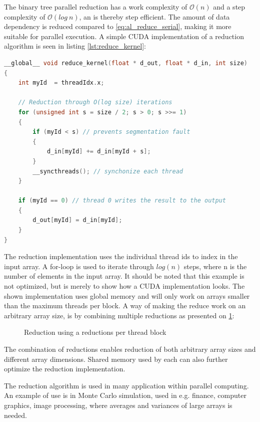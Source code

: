 The binary tree parallel reduction has a work complexity of $\mathcal{O}(n)$ and a step complexity of $\mathcal{O}(log ~ n)$, an is thereby step efficient. 
The amount of data dependency is reduced compared to \cref{eq:al_reduce_serial}, making it more suitable for parallel execution. A simple CUDA implementation of a reduction algorithm is seen in listing \ref{lst:reduce_kernel}:

\begin{lstlisting}[language=C,caption={TBD},label=lst:reduce_kernel]
__global__ void reduce_kernel(float * d_out, float * d_in, int size)
{
	int myId  = threadIdx.x; 

	// Reduction through O(log size) iterations
	for (unsigned int s = size / 2; s > 0; s >>= 1)
	{
		if (myId < s) // prevents segmentation fault
		{
			d_in[myId] += d_in[myId + s];
		}
		__syncthreads(); // synchonize each thread        
	}

	if (myId == 0) // thread 0 writes the result to the output
	{
		d_out[myId] = d_in[myId];
	}
}
\end{lstlisting}

The reduction implementation uses the individual thread ids to index in the input array. A for-loop is used to iterate through  $log(n)$ steps, where n is the number of elements in the input array. It should be noted that this example is not optimized, but is merely to show how a CUDA implementation looks. The shown implementation uses global memory and will only work on arrays smaller than the maximum threads per block. A way of making the reduce work on an arbitrary array size, is by combining multiple reductions as presented on \cref{fig:al_reduce_combine}:

\begin{figure}[ht]
	\centering
	\caption{Reduction using a reductions per thread block}
	\label{fig:al_reduce_combine}
\end{figure}

The combination of reductions enables reduction of both arbitrary array sizes and different array dimensions. Shared memory used by each  can also further optimize the reduction implementation.

The reduction algorithm is used in many application within parallel computing. An example of use is in Monte Carlo simulation, used in e.g. finance, computer graphics, image processing, where averages and variances of large arrays is needed.
